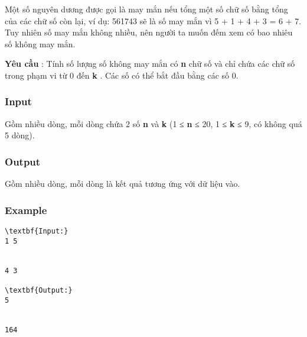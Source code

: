 



   Một số nguyên dương được gọi là may mắn nếu tổng một số chữ số bằng tổng của các chữ số còn lại, ví dụ: 561743 sẽ là số may mắn vì 5 + 1 + 4 + 3 = 6 + 7. Tuy nhiên số may mắn không nhiều, nên người ta muốn đếm xem có bao nhiêu số không may mắn.  

\textbf{Yêu cầu}   : Tính số lượng số không may mắn có   \textbf{n}   chữ số và chỉ chứa các chữ số trong phạm vi từ 0 đến   \textbf{k}   . Các số có thể bắt đầu bằng các số 0.  

\subsubsection{   Input  }

   Gồm nhiều dòng, mỗi dòng chứa 2 số   \textbf{n}   và   \textbf{k}   (1 ≤   \textbf{n}   ≤ 20, 1 ≤   \textbf{k}   ≤ 9, có không quá 5 dòng).  

\subsubsection{   Output  }

   Gồm nhiều dòng, mỗi dòng là kết quả tương ứng với dữ liệu vào.  

\subsubsection{   Example  }
\begin{verbatim}
\textbf{Input:}
1 5


4 3

\textbf{Output:}
5


164 \end{verbatim}
